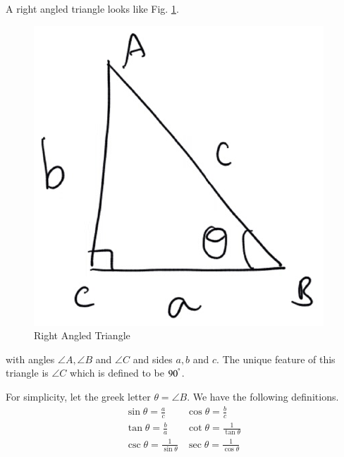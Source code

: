 
\begin{definition}


A right angled triangle looks like Fig. \ref{ch1_right}.
\begin{figure}[!h]
\begin{center}
	
\includegraphics[width=\columnwidth]{./figs/ch1_right_triangle}
\vspace*{-10cm}
\end{center}
\caption{Right Angled Triangle}
\label{ch1_right}	
\end{figure}
with angles $\angle A,\angle B$ and $\angle C$ and sides $a, b$ and $c$.  The unique feature of this triangle is $\angle C$ which is defined to be $90^{\degree}$.
\end{definition}
\begin{definition}
	For simplicity, let the greek letter $\theta = \angle B$.  We have the following definitions.
\begin{equation}
\label{ch1_trig_defs}
\begin{matrix}
	\sin \theta = \frac{a}{c} & 	\cos \theta = \frac{b}{c} \\
	\tan \theta = \frac{b}{a} & \cot \theta = \frac{1}{\tan \theta} \\
	\csc \theta = \frac{1}{\sin \theta} & \sec \theta = \frac{1}{\cos \theta}
	\end{matrix}
\end{equation}
\end{definition}

